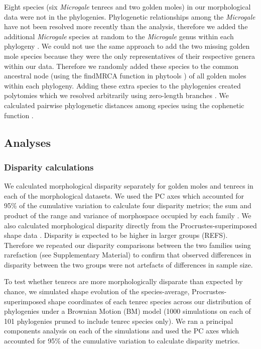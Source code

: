 \documentclass[12pt,a4paper]{article}
\begin{document}
Eight species (six \textit{Microgale} tenrecs and two golden moles) in our morphological data were not in the phylogenies. Phylogenetic relationships among the \textit{Microgale} have not been resolved more recently than the \citep{Kuhn2011} analysis, therefore we added the additional \textit{Microgale} species at random to the \textit{Microgale} genus within each phylogeny \citep{Revell2012}. We could not use the same approach to add the two missing golden mole species because they were the only representatives of their respective genera within our data. Therefore we randomly added these species to the common ancestral node (using the findMRCA function in phytools \citep{Revell2012}) of all golden moles within each phylogeny. Adding these extra species to the phylogenies created polytomies which we resolved arbitrarily using zero-length branches \citep{Paradis2004}. We calculated pairwise phylogenetic distances among species using the cophenetic function \citep[R Development Core][]{Team2013}. 
	
	
\subsection{Analyses}
\subsubsection{Disparity calculations} 

We calculated morphological disparity separately for golden moles and tenrecs in each of the morphological datasets. We used the PC axes which accounted for 95\% of the cumulative variation to calculate four disparity metrics; the sum and product of the range and variance of morphospace occupied by each family \citep{Brusatte2008, Foth2012, Ruta2013}. We also calculated morphological disparity directly from the Procrustes-superimposed shape data \citep{Zelditch2012}. 
Disparity is expected to be higher in larger groups (REFS). Therefore we repeated our disparity comparisons between the two families using rarefaction (see Supplementary Material) to confirm that observed differences in disparity between the two groups were not artefacts of differences in sample size.

To test whether tenrecs are more morphologically disparate than expected by chance, we simulated shape evolution  \citep{Harmon2008} of the species-average, Procrustes-superimposed shape coordinates of each tenrec species across our distribution of phylogenies under a Brownian Motion (BM) model (1000 simulations on each of 101 phylogenies pruned to include tenrec species only). We ran a principal components analysis on each of the simulations and used the PC axes which accounted for 95\% of the cumulative variation to calculate disparity metrics.
 
\end{document}
